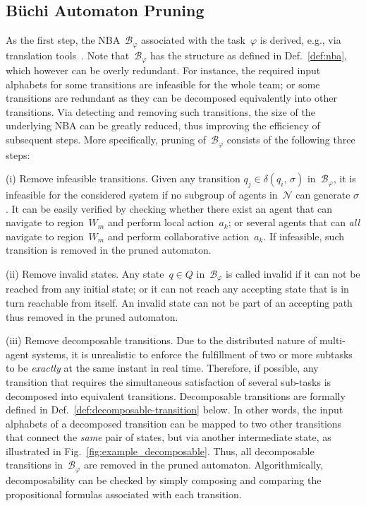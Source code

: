 \subsection{B\"{u}chi Automaton Pruning}
\label{subsubsec:NBA-pruning}
As the first step, the NBA~$\mathcal{B}_{\varphi}$ associated with the task~$\varphi$
is derived, e.g., via translation tools~\cite{gastin2001fast}.
Note that~$\mathcal{B}_{\varphi}$ has the structure as defined in Def.~\ref{def:nba},
which however can be overly redundant.
For instance, the required input alphabets for some transitions are infeasible for the whole team;
or some transitions are redundant as they can be decomposed equivalently
into other transitions.
Via detecting and removing such transitions, the size of the underlying NBA
can be greatly reduced, thus improving the efficiency of subsequent steps.
More specifically, pruning of~$\mathcal{B}_{\varphi}$ consists of the following three steps:

(i) Remove infeasible transitions.
Given any transition $q_j \in \delta(q_i,\, \sigma)$ in~$\mathcal{B}_{\varphi}$,
it is infeasible for the considered system if
no subgroup of agents in~$\mathcal{N}$ can generate $\sigma$.
It can be easily verified by checking whether there exist an agent that can navigate to region~$W_m$ and perform local action~$a_k$;
or several agents that can \emph{all} navigate to region~$W_m$ and perform collaborative action~$a_k$.
If infeasible, such transition is removed in the pruned automaton.

(ii) Remove invalid states.
Any state~$q\in Q$ in~$\mathcal{B}_{\varphi}$ is called invalid
if it can not be reached from any initial state;
or it can not reach any accepting state that is in turn reachable from itself.
An invalid state can not be part of an accepting path thus removed in the pruned automaton.

(iii) Remove decomposable transitions.
Due to the distributed nature of multi-agent systems,
it is unrealistic to enforce the fulfillment of two or more subtasks
to be \emph{exactly} at the same instant in real time.
Therefore, if possible,
any transition that requires the simultaneous satisfaction of several sub-tasks is decomposed into equivalent transitions.
Decomposable transitions are formally defined in
Def.~\ref{def:decomposable-transition} below.
In other words, the input alphabets of a decomposed transition can be mapped to
two other transitions that connect the \emph{same} pair of states,
but via another intermediate state, as illustrated in Fig.~\ref{fig:example_decomposable}.
Thus, all decomposable transitions in~$\mathcal{B}_{\varphi}$ are removed in the pruned automaton.
Algorithmically, decomposability can be checked by simply composing and comparing the
propositional formulas associated with each transition.


